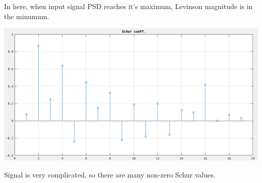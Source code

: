 \documentclass[12pt]{article}
\begin{document}
In here, when input signal PSD reaches it's maximum, Levinson magnitude is in the minumum.

\includegraphics[width=\textwidth]{16.png}

Signal is very complicated, so there are many non-zero Schur values.
\end{document}
